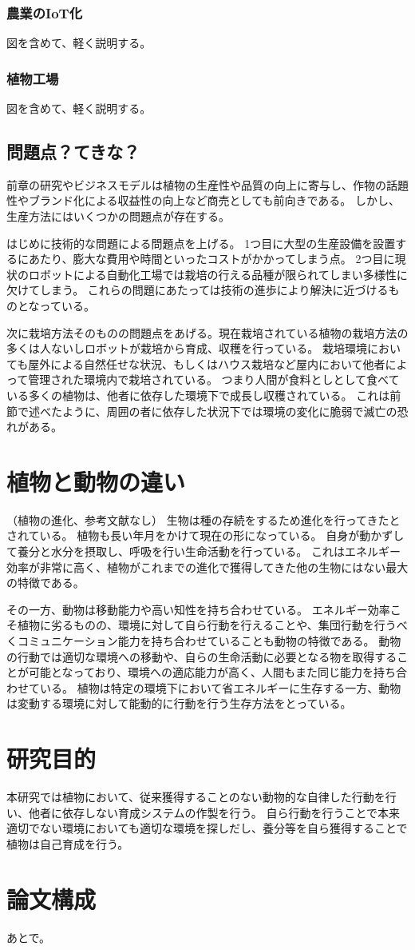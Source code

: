 \subsubsection{農業のIoT化}
図を含めて、軽く説明する。
\subsubsection{植物工場}
図を含めて、軽く説明する。

\subsection{問題点？てきな？}
前章の研究やビジネスモデルは植物の生産性や品質の向上に寄与し、作物の話題性やブランド化による収益性の向上など商売としても前向きである。
しかし、生産方法にはいくつかの問題点が存在する。
\par はじめに技術的な問題による問題点を上げる。
1つ目に大型の生産設備を設置するにあたり、膨大な費用や時間といったコストがかかってしまう点。
2つ目に現状のロボットによる自動化工場では栽培の行える品種が限られてしまい多様性に欠けてしまう。
これらの問題にあたっては技術の進歩により解決に近づけるものとなっている。
\par 次に栽培方法そのものの問題点をあげる。現在栽培されている植物の栽培方法の多くは人ないしロボットが栽培から育成、収穫を行っている。
栽培環境においても屋外による自然任せな状況、もしくはハウス栽培など屋内において他者によって管理された環境内で栽培されている。
つまり人間が食料としとして食べている多くの植物は、他者に依存した環境下で成長し収穫されている。
これは前節で述べたように、周囲の者に依存した状況下では環境の変化に脆弱で滅亡の恐れがある。
\section{植物と動物の違い}
（植物の進化、参考文献なし）
生物は種の存続をするため進化を行ってきたとされている。
植物も長い年月をかけて現在の形になっている。
自身が動かずして養分と水分を摂取し、呼吸を行い生命活動を行っている。
これはエネルギー効率が非常に高く、植物がこれまでの進化で獲得してきた他の生物にはない最大の特徴である。
\par その一方、動物は移動能力や高い知性を持ち合わせている。
エネルギー効率こそ植物に劣るものの、環境に対して自ら行動を行えることや、集団行動を行うべくコミュニケーション能力を持ち合わせていることも動物の特徴である。
動物の行動では適切な環境への移動や、自らの生命活動に必要となる物を取得することが可能となっており、環境への適応能力が高く、人間もまた同じ能力を持ち合わせている。
植物は特定の環境下において省エネルギーに生存する一方、動物は変動する環境に対して能動的に行動を行う生存方法をとっている。
\section{研究目的}
本研究では植物において、従来獲得することのない動物的な自律した行動を行い、他者に依存しない育成システムの作製を行う。
自ら行動を行うことで本来適切でない環境においても適切な環境を探しだし、養分等を自ら獲得することで植物は自己育成を行う。
\section{論文構成}
あとで。
